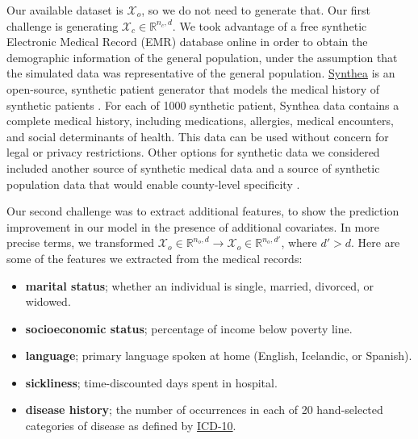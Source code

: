 \documentclass{article}
\begin{document}
Our available dataset is $\mathcal{X}_o$, so we do not need to generate that. Our first challenge is generating $\mathcal{X}_c \in \mathbb{R}^{n_c,d}$. We took advantage of a free synthetic Electronic Medical Record (EMR) database online in order to obtain the demographic information of the general population, under the assumption that the simulated data was representative of the general population. \href{https://synthetichealth.github.io/synthea/#home}{Synthea} is an open-source, synthetic patient generator that models the medical history of synthetic patients \citep{walonoski18}. For each of 1000 synthetic patient, Synthea data contains a complete medical history, including medications, allergies, medical encounters, and social determinants of health. This data can be used without concern for legal or privacy restrictions. Other options for synthetic data we considered included another source of synthetic medical data \citep{kartoun16} and a source of synthetic population data that would enable county-level specificity \citep{gallagher17}.

Our second challenge was to extract additional features, to show the prediction improvement in our model in the presence of additional covariates. In more precise terms, we transformed $\mathcal{X}_o \in \mathbb{R}^{n_o,d} \to \mathcal{X}_o \in \mathbb{R}^{n_o,d'}$, where $d' > d$. Here are some of the features we extracted from the medical records:
\begin{itemize}
\item {\bf marital status}; whether an individual is single, married, divorced, or widowed.
\item {\bf socioeconomic status}; percentage of income below poverty line.
\item {\bf language}; primary language spoken at home (English, Icelandic, or Spanish).
\item {\bf sickliness}; time-discounted days spent in hospital.
\item {\bf disease history}; the number of occurrences in each of 20 hand-selected categories of disease as defined by \href{http://apps.who.int/classifications/icd10/browse/2016/en}{ICD-10}.
\end{itemize}
\end{document}
